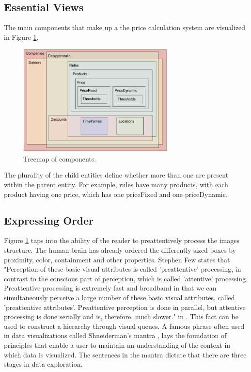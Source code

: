 \subsection{Essential Views}
The main components that make up a the price calculation system are visualized in Figure \ref{fig:Treemap}.

\begin{figure}[H]
	\centering
	\includegraphics[width=0.7\textwidth]{Treemap}
	\caption[Treemap of Components]{Treemap of components.}
	\label{fig:Treemap}
\end{figure}

The plurality of the child entities define whether more than one are present within the parent entity. For example, rules have many products, with each product having one price, which has one priceFixed and one priceDynamic.

\subsection{Expressing Order}
Figure \ref{fig:Treemap} taps into the ability of the reader to preattentively process the images structure. The human brain has already ordered the differently sized boxes by proximity, color, containment and other properties. Stephen Few states that "Perception of these basic visual attributes is called 'preattentive' processing, in contrast to the conscious part of perception, which is called 'attentive' processing. Preattentive processing is extremely fast and broadband in that we can simultaneously perceive a large number of these basic visual attributes, called 'preattentive attributes'. Preattentive perception is done in parallel, but attentive processing is done serially and is, therefore, much slower." in \cite[p.~3]{few}. This fact can be used to construct a hierarchy through visual queues. A famous phrase often used in data visualizations called Shneiderman's mantra \cite{mantra}, lays the foundation of principles that enable a user to maintain an understanding of the context in which data is visualized. The sentences in the mantra dictate that there are three stages in data exploration.

